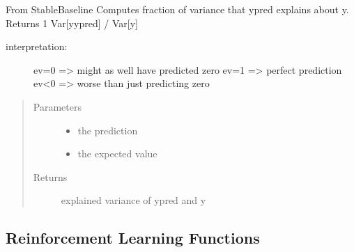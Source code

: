 \documentclass[letterpaper,10pt,english]{sphinxmanual}
\begin{document}
\begin{fulllineitems}
\label{\detokenize{agents.reinforcement_learning:agents.reinforcement_learning.ppo_masked.explained_variance}}
\sphinxAtStartPar
From Stable\sphinxhyphen{}Baseline
Computes fraction of variance that ypred explains about y.
Returns 1 \sphinxhyphen{} Var{[}y\sphinxhyphen{}ypred{]} / Var{[}y{]}
\begin{description}
\item[{interpretation:}] \leavevmode
\sphinxAtStartPar
ev=0  =\textgreater{}  might as well have predicted zero
ev=1  =\textgreater{}  perfect prediction
ev\textless{}0  =\textgreater{}  worse than just predicting zero

\end{description}
\begin{quote}\begin{description}
\item[{Parameters}] \leavevmode\begin{itemize}
\item {} 
\sphinxAtStartPar
{} \textendash{} the prediction

\item {} 
\sphinxAtStartPar
{} \textendash{} the expected value

\end{itemize}

\item[{Returns}] \leavevmode
\sphinxAtStartPar
explained variance of ypred and y

\end{description}\end{quote}

\end{fulllineitems}



\subsection{Reinforcement Learning Functions}
\label{\detokenize{agents.reinforcement_learning:reinforcement-learning-functions}}
\end{document}

